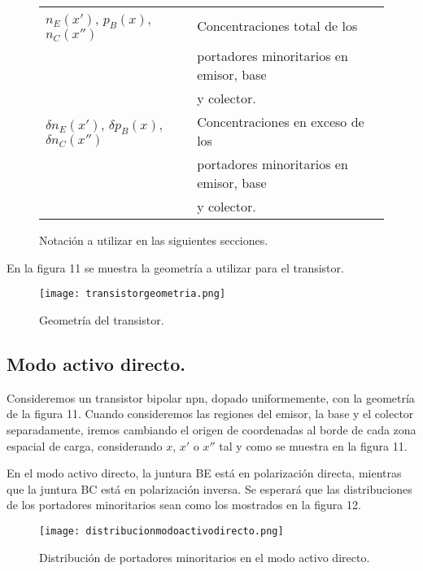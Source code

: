 \documentclass[12pt,a4paper]{article}
\begin{document}
\begin{figure}[ht!]
\begin{center}
\begin{tabular}{|ll|}
$n_{E}(x')$, $p_{B}(x)$, $n_{C}(x'')$ & Concentraciones total de los \\ & portadores minoritarios en emisor, base \\ & y colector. \\
$\delta n_{E}(x')$, $\delta p_{B}(x)$, $\delta n_{C}(x'')$ & Concentraciones en exceso de los \\ & portadores minoritarios en emisor, base\\ & y colector. \\ \hline
\end{tabular}
\caption{Notación a utilizar en las siguientes secciones.}
\end{center}
\end{figure}

En la figura 11 se muestra la geometría a utilizar para el transistor.

\begin{figure}[ht!]
\begin{center}
\texttt{[image: transistorgeometria.png]}
\caption{Geometría del transistor.}
\end{center}
\end{figure}

\subsection{Modo activo directo.}

Consideremos un transistor bipolar npn, dopado uniformemente, con la geometría de la figura 11. Cuando consideremos las regiones del emisor, la base y el colector separadamente, iremos cambiando el origen de coordenadas al borde de cada zona espacial de carga, considerando $x$, $x'$ o $x''$ tal y como se muestra en la figura 11.

En el modo activo directo, la juntura BE está en polarización directa, mientras que la juntura BC está en polarización inversa. Se esperará que las distribuciones de los portadores minoritarios sean como los mostrados en la figura 12.

\begin{figure}[ht!]
\begin{center}
\texttt{[image: distribucionmodoactivodirecto.png]}
\caption{Distribución de portadores minoritarios en el modo activo directo.}
\end{center}
\end{figure}
\end{document}
